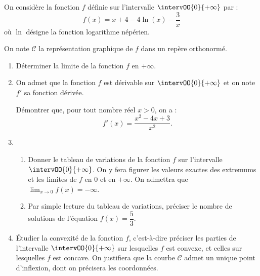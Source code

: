 On considère la fonction $f$ définie sur l’intervalle $\intervOO{0}{+\infty}$ par : $$f(x)=x+4-4\ln(x)-\dfrac{3}{x}$$ où $\ln$ désigne la fonction logarithme népérien.

On note $\mathcal{C}$ la représentation graphique de $f$ dans un repère orthonormé.

\begin{enumerate}
	\item Déterminer la limite de la fonction $f$ en $+\infty$.
	\item On admet que la fonction $f$ est dérivable sur $\intervOO{0}{+\infty}$ et on note $f'$ sa fonction dérivée.
	
	Démontrer que, pour tout nombre réel $x>0$, on a : \[f'(x)=\dfrac{x^2-4x+3}{x^2}.\]
	\item 
	\begin{enumerate}
		\item Donner le tableau de variations de la fonction $f$ sur l’intervalle $\intervOO{0}{+\infty}$. On y fera figurer les valeurs exactes des extremums et les limites de $f$ en $0$ et en $+\infty$. On admettra que $\displaystyle\lim_{x \to 0} f(x)=-\infty$.
		\item Par simple lecture du tableau de variations, préciser le nombre de solutions de l’équation \mbox{$f(x)=\dfrac53$}.
	\end{enumerate}
	\item Étudier la convexité de la fonction $f$, c’est-à-dire préciser les parties de l’intervalle $\intervOO{0}{+\infty}$ sur lesquelles $f$ est convexe, et celles sur lesquelles $f$ est concave. On justifiera que la courbe $\mathcal{C}$ admet un unique point d’inflexion, dont on précisera les coordonnées.
\end{enumerate}